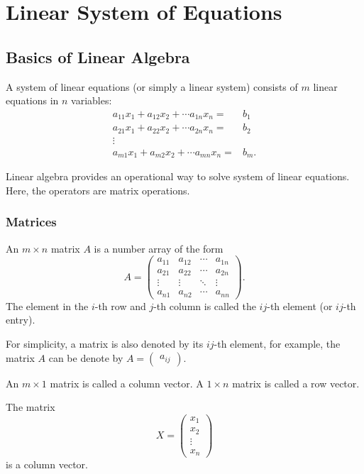 \chapter{Linear System of Equations}

\section{Basics of Linear Algebra}

A system of linear equations (or simply a linear system) consists of $m$ linear equations in $n$ variables:
\begin{equation}\label{eq:linearsystem}
  \begin{aligned}
  a_{11}x_1+a_{12}x_2+\cdots a_{1n}x_n=&b_1\\  
  a_{21}x_1+a_{22}x_2+\cdots a_{2n}x_n=&b_2\\  
  \vdots\\
  a_{m1}x_1+a_{m2}x_2+\cdots a_{mn}x_n=&b_m.  
  \end{aligned}  
\end{equation}

Linear algebra provides an operational way to solve system of linear equations. Here, the operators are matrix operations.

\subsection*{Matrices}

An $m\times n$ matrix $A$ is a number array of the form
\[
  A=
  \begin{pmatrix}
  a_{11} & a_{12} &\cdots & a_{1n}\\
  a_{21} & a_{22} &\cdots & a_{2n}\\
  \vdots & \vdots & \ddots & \vdots\\
  a_{n1} & a_{n2} &\cdots & a_{nn}
\end{pmatrix}.
\]
The element in the $i$-th row and $j$-th column is called the $ij$-th element (or $ij$-th entry).

For simplicity, a matrix is also denoted by its $ij$-th element, for example, the matrix $A$ can be denote by $A=\begin{pmatrix}  a_{ij} \end{pmatrix}$.

An $m\times 1$ matrix is called a column vector. A $1\times n$ matrix is called a row vector. 

\begin{example}
  The matrix
  \[X=\begin{pmatrix}
    x_1\\
    x_2\\
    \vdots\\
    x_n
  \end{pmatrix}\]
  is a column vector.
\end{example}

